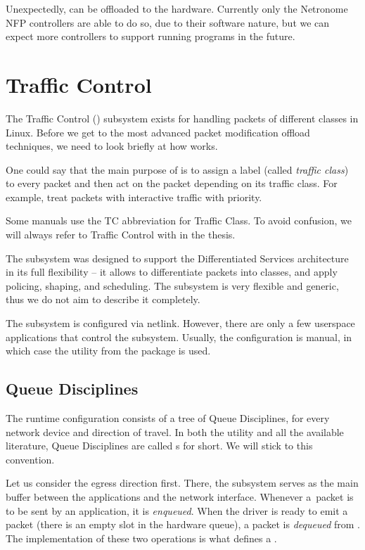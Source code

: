 Unexpectedly,  can be offloaded to the hardware. Currently only the
Netronome NFP controllers are able to do so, due to their software nature, but
we can expect more controllers to support running  programs in the future.

\section{Traffic Control}
\label{sec:tc}

\newcommand{\qdisc}{\a{qdisc}}

The Traffic Control () subsystem exists for handling packets of different
classes in Linux. Before we get to the most advanced packet modification offload
techniques, we need to look briefly at how  works.

One could say that the main purpose of  is to assign a label (called
\emph{traffic class}) to every packet and then act on the packet depending on
its traffic class. For example, treat packets with interactive traffic with
priority.

Some manuals use the TC abbreviation for Traffic Class. To avoid confusion, we
will always refer to Traffic Control with  in the thesis.

The  subsystem was designed to support the Differentiated Services architecture in
its full flexibility -- it allows to differentiate packets into classes, and apply
policing, shaping, and scheduling. The subsystem is very flexible and generic,
thus we do not aim to describe it completely.

The subsystem is configured via netlink. However, there are only a few
userspace applications that control the  subsystem. Usually, the
configuration is manual, in which case the  utility from the 
package is used.

\subsection{Queue Disciplines}

The  runtime configuration consists of a tree of Queue Disciplines, for
every network device and direction of travel. In both the  utility and
all the available literature, Queue Disciplines are called \qdisc{}s for short. We
will stick to this convention.

Let us consider the egress direction first. There, the  subsystem serves as the main buffer
between the applications and the network interface. Whenever a~packet is to be sent
by an application, it is \emph{enqueued}. When the driver is ready to emit
a packet (there is an empty slot in the hardware queue), a packet is
\emph{dequeued} from . The implementation of these two operations is what
defines a \qdisc.

